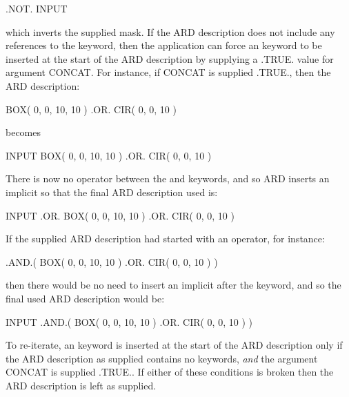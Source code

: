 \documentclass[11pt]{starlink}
\begin{document}
\small
\begin{terminalv}
      .NOT. INPUT
\end{terminalv}
\normalsize

which inverts the supplied mask. If the ARD description does not include any
references to the  keyword, then the application can force an  keyword
to be inserted at the start of the ARD description by supplying a .TRUE. value
for  argument CONCAT. For instance, if CONCAT is supplied .TRUE., then
the ARD description:

\small
\begin{terminalv}
      BOX( 0, 0, 10, 10 ) .OR. CIR( 0, 0, 10 )
\end{terminalv}
\normalsize

becomes

\small
\begin{terminalv}
      INPUT BOX( 0, 0, 10, 10 ) .OR. CIR( 0, 0, 10 )
\end{terminalv}
\normalsize

There is now no operator between the  and  keywords, and so ARD inserts
an implicit  so that the final ARD description used is:

\small
\begin{terminalv}
      INPUT .OR. BOX( 0, 0, 10, 10 ) .OR. CIR( 0, 0, 10 )
\end{terminalv}
\normalsize

If the supplied ARD description had started with an operator, for instance:

\small
\begin{terminalv}
      .AND.( BOX( 0, 0, 10, 10 ) .OR. CIR( 0, 0, 10 ) )
\end{terminalv}
\normalsize

then there would be no need to insert an implicit  after the  keyword,
and so the final used ARD description would be:

\small
\begin{terminalv}
      INPUT .AND.( BOX( 0, 0, 10, 10 ) .OR. CIR( 0, 0, 10 ) )
\end{terminalv}
\normalsize

To re-iterate, an  keyword is inserted at the start of the ARD description
only if the ARD description as supplied contains no  keywords, \emph{and}
the  argument CONCAT is supplied .TRUE.. If either of these conditions
is broken then the ARD description is left as supplied.
\end{document}
